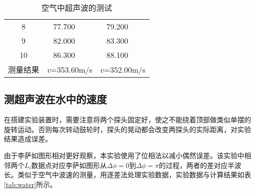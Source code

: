 \documentclass[12pt]{article}
\begin{document}
\begin{table}[htbp]
\begin{tabular}{|ccccc|}
    \multicolumn{1}{|c|}{8}    & \multicolumn{1}{c|}{77.700}    & \multicolumn{1}{c|}{}                      & \multicolumn{1}{c|}{79.200}    &                       \\ \cline{1-2} \cline{4-4}
    \multicolumn{1}{|c|}{9}    & \multicolumn{1}{c|}{82.000}    & \multicolumn{1}{c|}{}                      & \multicolumn{1}{c|}{83.300}    &                       \\ \cline{1-2} \cline{4-4}
    \multicolumn{1}{|c|}{10}   & \multicolumn{1}{c|}{86.300}    & \multicolumn{1}{c|}{}                      & \multicolumn{1}{c|}{88.100}    &                       \\ \hline
    \multicolumn{1}{|c|}{测量结果} & \multicolumn{2}{c|}{$v$=353.60m/s}                                            & \multicolumn{2}{c|}{$v$=352.00m/s}                       \\ \hline
    \end{tabular}
    \label{tab:air}
    \caption{空气中超声波的测试}
\end{table}

\subsection{测超声波在水中的速度}
在搭建实验装置时，需要注意将两个探头固定好，使之不能绕着顶部做类似单摆的旋转运动。否则每次转动鼓轮时，探头的晃动都会改变两探头的实际距离，对实验结果造成误差。

由于李萨如图形相对更好观察，本实验使用了位相法以减小偶然误差。该实验中相邻两个$L_i$数据点对应李萨如图形从$\Delta\phi=0$到$\Delta\phi=\pi$的过程，两者的差对应半波长。类似于空气中波速的测量，用逐差法处理实验数据，实验数据与计算结果如表\ref{tab:water}所示。
\end{document}
